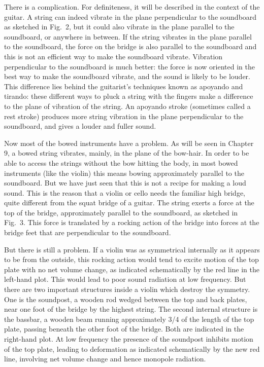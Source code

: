 
  There is a complication. For definiteness, it will be described in the 
  context of the guitar. A string can indeed vibrate in the plane perpendicular 
  to the soundboard as sketched in Fig.\ 2, but it could also vibrate in the 
  plane parallel to the soundboard, or anywhere in between. If the string 
  vibrates in the plane parallel to the soundboard, the force on the bridge is 
  also parallel to the soundboard and this is not an efficient way to make the 
  soundboard vibrate. Vibration perpendicular to the soundboard is much better: 
  the force is now oriented in the best way to make the soundboard vibrate, and 
  the sound is likely to be louder. This difference lies behind the guitarist's 
  techniques known as apoyando and tirando: these different ways to pluck a 
  string with the fingers make a difference to the plane of vibration of the 
  string. An apoyando stroke (sometimes called a rest stroke) produces more 
  string vibration in the plane perpendicular to the soundboard, and gives a 
  louder and fuller sound. 

  Now most of the bowed instruments have a problem. As will be seen in Chapter 
  9, a bowed string vibrates, mainly, in the plane of the bow-hair. In order to 
  be able to access the strings without the bow hitting the body, in most bowed 
  instruments (like the violin) this means bowing approximately parallel to the 
  soundboard. But we have just seen that this is not a recipe for making a loud 
  sound. This is the reason that a violin or cello needs the familiar high 
  bridge, quite different from the squat bridge of a guitar. The string exerts 
  a force at the top of the bridge, approximately parallel to the soundboard, 
  as sketched in Fig.\ 3. This force is translated by a rocking action of the 
  bridge into forces at the bridge feet that are perpendicular to the 
  soundboard. 

  But there is still a problem. If a violin was as symmetrical internally as it 
  appears to be from the outside, this rocking action would tend to excite 
  motion of the top plate with no net volume change, as indicated schematically 
  by the red line in the left-hand plot. This would lead to poor sound 
  radiation at low frequency. But there are two important structures inside a 
  violin which destroy the symmetry. One is the soundpost, a wooden rod wedged 
  between the top and back plates, near one foot of the bridge by the highest 
  string. The second internal structure is the bassbar, a wooden beam running 
  approximately 3/4 of the length of the top plate, passing beneath the other 
  foot of the bridge. Both are indicated in the right-hand plot. At low 
  frequency the presence of the soundpost inhibits motion of the top plate, 
  leading to deformation as indicated schematically by the new red line, 
  involving net volume change and hence monopole radiation. 


